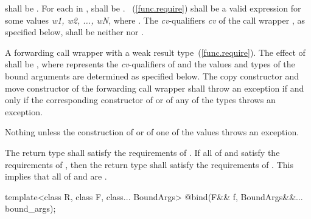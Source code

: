 \begin{itemdescr}
\pnum
\requires
{} shall be . For each 
in ,  shall be .
~(\ref{func.require}) shall be a valid expression for some
values \textit{w1, w2, ..., wN}, where
.
The \textit{cv}-qualifiers \textit{cv} of the call wrapper ,
as specified below, shall be neither  nor .

\pnum\returns A forwarding call wrapper  with a weak result
type~(\ref{func.require}). The effect of  shall
be , where  represents the
\textit{cv}-qualifiers of  and the values and types of the bound
arguments  are determined as specified below.
The copy constructor and move constructor of the forwarding call wrapper shall throw an
exception if and only if the corresponding constructor of  or of any of the types
 throws an exception.

\pnum
\throws Nothing unless the construction of
 or of one of the values  throws an exception.

\pnum
\notes The return type shall satisfy the requirements of . If all
of  and  satisfy the requirements of , then the
return type shall satisfy the requirements of . \enternote This implies
that all of  and  are . \exitnote
\end{itemdescr}

\begin{itemdecl}
template<class R, class F, class... BoundArgs>
  @\unspec@ bind(F&& f, BoundArgs&&... bound_args);
\end{itemdecl}

